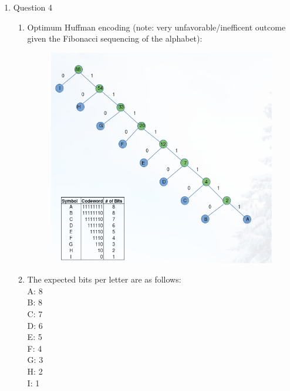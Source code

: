 \documentclass{article}
\begin{document}
\begin{enumerate}
\begin{enumerate}
\begin{proof}
      \end{proof}

  \end{enumerate}

  \item Question 4
    \begin{enumerate}
      \item Optimum Huffman encoding (note: very unfavorable/inefficent outcome given the Fibonacci
        sequencing of the alphabet):\\
        \begin{figure}[h]
          \centering
        \includegraphics[scale=.65]{huffman3.png}
        \end{figure}

      \item The expected bits per letter are as follows:\\
        A: 8\\
        B: 8\\
        C: 7\\
        D: 6\\
        E: 5\\
        F: 4\\
        G: 3\\
        H: 2\\
        I: 1\\


\end{enumerate}
\end{enumerate}
\end{document}
